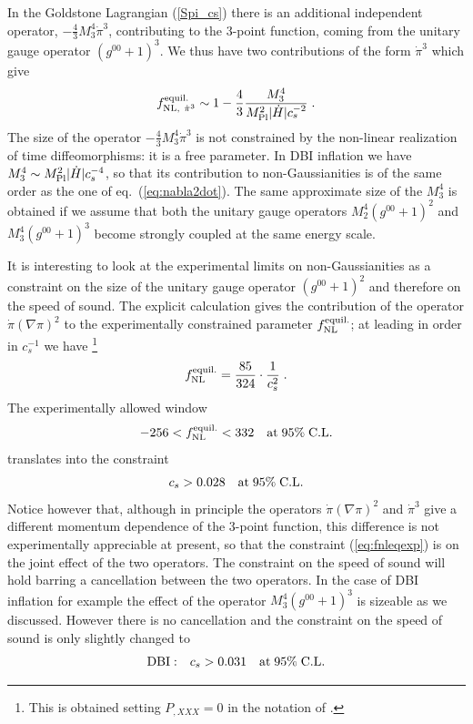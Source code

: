 \documentclass[12pt,letterpaper]{article}
\def\be{\begin{eqnarray}}
\def\ee{\end{eqnarray}}
\begin{document}
{In the Goldstone Lagrangian (\ref{Spi_cs}) there is an
additional independent operator, $-\frac43 M_3^4 \dot\pi^3$,
contributing to the 3-point function, coming from the unitary gauge
operator $(g^{00}+1)^3$. We thus have two contributions of the form
$\dot\pi^3$ which give
\begin{equation}\label{fnldotpicube}
f^{\rm equil.}_{\rm NL,\ \dot\pi^3}\sim 1-\frac{4}{3}
\frac{M_3^4}{M_{\rm Pl}^2 |\dot H| c_s^{-2}} \;.
\end{equation}
The size of the operator $-\frac43 M_3^4 \dot\pi^3$ is not constrained
by the non-linear realization of time diffeomorphisms: it is a free
parameter. In DBI inflation \cite{Alishahiha:2004eh} we have 
$M_3^4 \sim M_{\rm Pl}^2 |\dot H| c_s^{-4}$, so that its contribution to
non-Gaussianities is of the same order as the one of 
eq.~(\ref{eq:nabla2dot}). The same approximate size of the $M_3^4$ is
obtained if we assume that both the unitary gauge operators 
$M_2^4 (g^{00}+1)^2$ and $M_3^4 (g^{00}+1)^3$ become strongly coupled
at the same energy scale.

It is interesting to look at the experimental limits on
non-Gaussianities as a constraint on the size of the unitary gauge operator
$(g^{00}+1)^2$ and therefore on the speed of sound. The explicit
calculation \cite{Chen:2006nt} gives the contribution of the operator $\dot\pi
(\nabla\pi)^2$ to the experimentally constrained parameter $f_{\rm
  NL}^{\rm equil.}$; at leading in order in $c_s^{-1}$ we have
\footnote{This is obtained setting $P_{,XXX}=0$ in the notation of  \cite{Chen:2006nt}.}
\be
f_{\rm NL}^{\rm equil.} = \frac{85}{324} \cdot \frac1{c_s^2} \;.
\ee
The experimentally allowed window \cite{Creminelli:2006rz}
\be
\label{eq:fnleqexp}
-256 < f_{\rm NL}^{\rm equil.} < 332 \quad {\rm at} \; 95\% \;{\rm C.L.}
\ee
translates into the constraint 
\be
c_s > 0.028 \quad {\rm at} \; 95\% \;{\rm C.L.}
\ee
Notice however that, although in principle the operators $\dot\pi (\nabla\pi)^2$
and $\dot\pi^3$ give a different momentum dependence of the 3-point
function, this difference is not experimentally appreciable at present,
so that the constraint (\ref{eq:fnleqexp}) is on the joint effect of the two
operators. The constraint on the speed of sound will hold barring
a cancellation between the two operators. In the case of DBI inflation
for example the effect of the operator $M_3^4 (g^{00}+1)^3$ is
sizeable as we discussed. However there is no cancellation and the
constraint on the speed of sound is only slightly changed to
\be
{\rm DBI:} \quad c_s > 0.031 \quad {\rm at} \; 95\% \;{\rm C.L.}
\ee

}
\end{document}

